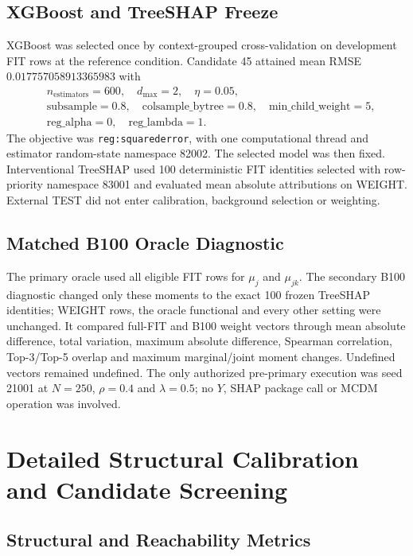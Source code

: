 \documentclass[runningheads]{llncs}
\begin{document}
\subsection{XGBoost and TreeSHAP Freeze}

XGBoost was selected once by context-grouped cross-validation on development FIT rows at the
reference condition. Candidate 45 attained mean RMSE $0.017757058913365983$ with
\begin{equation}
\begin{split}
&n_{\mathrm{estimators}}=600,\quad d_{\max}=2,\quad \eta=0.05,\\
&\text{subsample}=0.8,\quad \text{colsample\_bytree}=0.8,\quad
\text{min\_child\_weight}=5,\\
&\text{reg\_alpha}=0,\quad \text{reg\_lambda}=1.
\end{split}
\label{supp:eq:xgbparams}
\end{equation}
The objective was \texttt{reg:squarederror}, with one computational thread and estimator
random-state namespace 82002. The selected model was then fixed. Interventional TreeSHAP used 100 deterministic FIT
identities selected with row-priority namespace 83001 and evaluated mean absolute attributions
on WEIGHT. External TEST did not enter calibration, background selection or weighting.

\subsection{Matched B100 Oracle Diagnostic}

The primary oracle used all eligible FIT rows for $\mu_j$ and $\mu_{jk}$. The secondary B100
diagnostic changed only these moments to the exact 100 frozen TreeSHAP identities; WEIGHT rows,
the oracle functional and every other setting were unchanged. It compared full-FIT and B100
weight vectors through mean absolute difference, total variation, maximum absolute difference,
Spearman correlation, Top-3/Top-5 overlap and maximum marginal/joint moment changes. Undefined
vectors remained undefined. The only authorized pre-primary execution was seed 21001 at
$N=250$, $\rho=0.4$ and $\lambda=0.5$; no $Y$, SHAP package call or MCDM operation was involved.

\section{Detailed Structural Calibration and Candidate Screening}

\subsection{Structural and Reachability Metrics}
\end{document}
